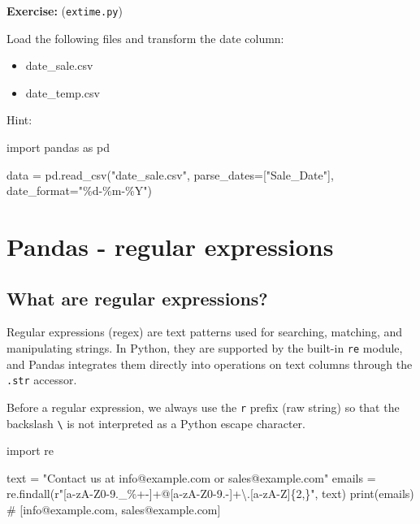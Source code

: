 \documentclass[
  english,
  letterpaper,
  DIV=11,
  numbers=noendperiod]{scrreprt}
\newenvironment{Shaded}{\begin{snugshade}}{\end{snugshade}}
\newcommand{\BuiltInTok}[1]{\textcolor[rgb]{0.00,0.23,0.31}{#1}}
\newcommand{\CharTok}[1]{\textcolor[rgb]{0.13,0.47,0.30}{#1}}
\newcommand{\CommentTok}[1]{\textcolor[rgb]{0.37,0.37,0.37}{#1}}
\newcommand{\ImportTok}[1]{\textcolor[rgb]{0.00,0.46,0.62}{#1}}
\newcommand{\NormalTok}[1]{\textcolor[rgb]{0.00,0.23,0.31}{#1}}
\newcommand{\OperatorTok}[1]{\textcolor[rgb]{0.37,0.37,0.37}{#1}}
\newcommand{\PreprocessorTok}[1]{\textcolor[rgb]{0.68,0.00,0.00}{#1}}
\newcommand{\SpecialCharTok}[1]{\textcolor[rgb]{0.37,0.37,0.37}{#1}}
\newcommand{\StringTok}[1]{\textcolor[rgb]{0.13,0.47,0.30}{#1}}
\newcommand{\VerbatimStringTok}[1]{\textcolor[rgb]{0.13,0.47,0.30}{#1}}
\begin{document}
\textbf{Exercise:} (\texttt{extime.py})

Load the following files and transform the date column:

\begin{itemize}
\item
  date\_sale.csv
\item
  date\_temp.csv
\end{itemize}

Hint:

\begin{Shaded}
\begin{Highlighting}[]
\ImportTok{import}\NormalTok{ pandas }\ImportTok{as}\NormalTok{ pd}

\NormalTok{data }\OperatorTok{=}\NormalTok{ pd.read\_csv(}\StringTok{"date\_sale.csv"}\NormalTok{, parse\_dates}\OperatorTok{=}\NormalTok{[}\StringTok{"Sale\_Date"}\NormalTok{], date\_format}\OperatorTok{=}\StringTok{"}\SpecialCharTok{\%d}\StringTok{{-}\%m{-}\%Y"}\NormalTok{)}
\end{Highlighting}
\end{Shaded}

\chapter{Pandas - regular
expressions}\label{pandas---regular-expressions}

\section{What are regular
expressions?}\label{what-are-regular-expressions}

Regular expressions (regex) are text patterns used for searching,
matching, and manipulating strings. In Python, they are supported by the
built-in \texttt{re} module, and Pandas integrates them directly into
operations on text columns through the \texttt{.str} accessor.

Before a regular expression, we always use the \texttt{r} prefix (raw
string) so that the backslash \texttt{\textbackslash{}} is not
interpreted as a Python escape character.

\begin{Shaded}
\begin{Highlighting}[]
\ImportTok{import}\NormalTok{ re}

\NormalTok{text }\OperatorTok{=} \StringTok{"Contact us at info@example.com or sales@example.com"}
\NormalTok{emails }\OperatorTok{=}\NormalTok{ re.findall(}\VerbatimStringTok{r"}\PreprocessorTok{[a{-}zA{-}Z0{-}9.\_\%+{-}]}\OperatorTok{+}\VerbatimStringTok{@}\PreprocessorTok{[a{-}zA{-}Z0{-}9.{-}]}\OperatorTok{+}\CharTok{\textbackslash{}.}\PreprocessorTok{[a{-}zA{-}Z]}\OperatorTok{\{2,\}}\VerbatimStringTok{"}\NormalTok{, text)}
\BuiltInTok{print}\NormalTok{(emails)}
\CommentTok{\# [\textquotesingle{}info@example.com\textquotesingle{}, \textquotesingle{}sales@example.com\textquotesingle{}]}
\end{Highlighting}
\end{Shaded}
\end{document}
